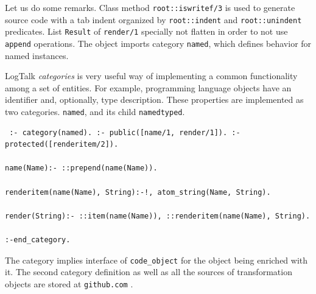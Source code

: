 \documentclass[conference]{IEEEtran} \IEEEoverridecommandlockouts
\begin{document}
Let us do some remarks. Class method \verb|root::iswritef/3| is used to generate source code with a tab indent organized by \verb|root::indent| and \verb|root::unindent| predicates. List \verb|Result| of \verb|render/1| specially not flatten in order to not use \verb|append| operations. The object imports category \verb|named|, which defines behavior for named instances. 

LogTalk \emph{categories} is very useful way of implementing a common functionality among a set of entities. For example, programming language objects have an identifier and, optionally, type description. These properties are implemented as two categories. \texttt{named}, and its child \texttt{namedtyped}. \begin{verbatim} :- category(named). :- public([name/1, render/1]). :- protected([renderitem/2]). 

name(Name):- ::prepend(name(Name)). 

renderitem(name(Name), String):-!, atom_string(Name, String). 

render(String):- ::item(name(Name)), ::renderitem(name(Name), String). 

:-end_category. \end{verbatim} 

The category implies interface of \texttt{code\_object} for the object being enriched with it. The second category definition as well as all the sources of transformation objects are stored at \texttt{github.com} \cite{ghsrc}. 
\end{document}
